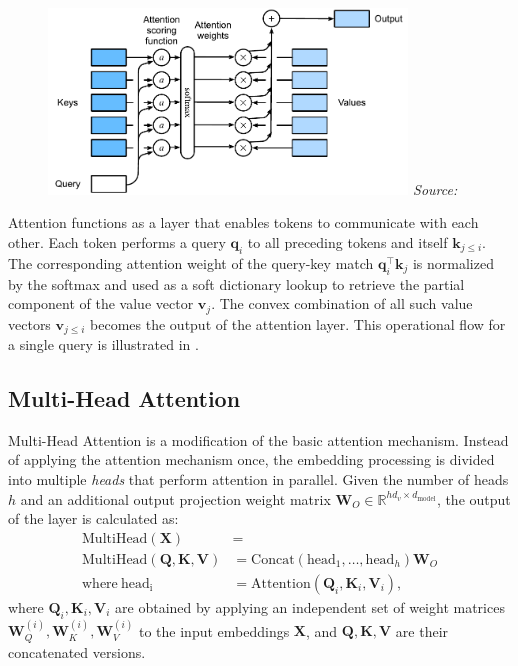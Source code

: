 \begin{figure}[ht]
    \centering
    \includegraphics[width=0.85\textwidth]{figures/attention.pdf}
    \label{fig:attention}
    \hfill\textit{Source: \citet{zhang2023b}}
\end{figure}

Attention functions as a layer that enables tokens to communicate with each other. Each token performs a query \(\mathbf{q}_i\) to all preceding tokens and itself \(\mathbf{k}_{j \le i}\). The corresponding attention weight of the query-key match \(\mathbf{q}_{i}^\top\mathbf{k}_{j}\) is normalized by the softmax and used as a soft dictionary lookup to retrieve the partial component of the value vector \(\mathbf{v}_j\). The convex combination of all such value vectors \(\mathbf{v}_{j \le i}\) becomes the output of the attention layer. This operational flow for a single query is illustrated in .

\subsection{Multi-Head Attention}

Multi-Head Attention is a modification of the basic attention mechanism. Instead of applying the attention mechanism once, the embedding processing is divided into multiple \textit{heads} that perform attention in parallel. Given the number of heads \(h\) and an additional output projection weight matrix \(\mathbf{W}_O \in \mathbb{R}^{hd_v \times d_{\mathrm{model}}}\), the output of the layer is calculated as:
\begin{align}
    \mathrm{MultiHead}(\mathbf{X}) &= \\ \mathrm{MultiHead}(\mathbf{Q}, \mathbf{K}, \mathbf{V}) &= \mathrm{Concat}(\mathrm{head}_1, \ldots, \mathrm{head}_h) \mathbf{W}_O \\
    \text{where}~\mathrm{head_i} &= \mathrm{Attention}(\mathbf{Q}_i, \mathbf{K}_i, \mathbf{V}_i),
\end{align}
where \(\mathbf{Q}_i, \mathbf{K}_i, \mathbf{V}_i\) are obtained by applying an independent set of weight matrices \(\mathbf{W}_Q^{(i)}, \mathbf{W}_K^{(i)}, \mathbf{W}_V^{(i)}\) to the input embeddings \(\mathbf{X}\), and \(\mathbf{Q}, \mathbf{K}, \mathbf{V}\) are their concatenated versions.

